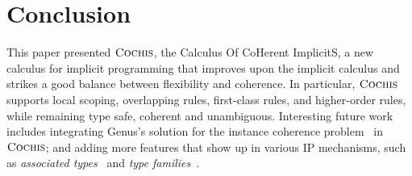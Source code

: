 \section{Conclusion}
\label{sec:conclusion}

This paper presented $\textsc{Cochis}$, the Calculus Of CoHerent ImplicitS, a new
calculus for implicit programming that improves upon the implicit calculus and
strikes a good balance between flexibility and coherence. In particular,
$\textsc{Cochis}$ supports local scoping, overlapping rules, first-class
rules, and higher-order rules, while remaining type safe, coherent and
unambiguous.
Interesting future work includes integrating Genus's solution for the
instance coherence problem~\cite{Zhang15LFO} in $\textsc{Cochis}$; and 
adding more features that show up 
in various IP mechanisms, such as \emph{associated types}~\cite{assoctypes,assoctypes2} and \emph{type
  families}~\cite{typefunc}.

 





%
% 
% 






